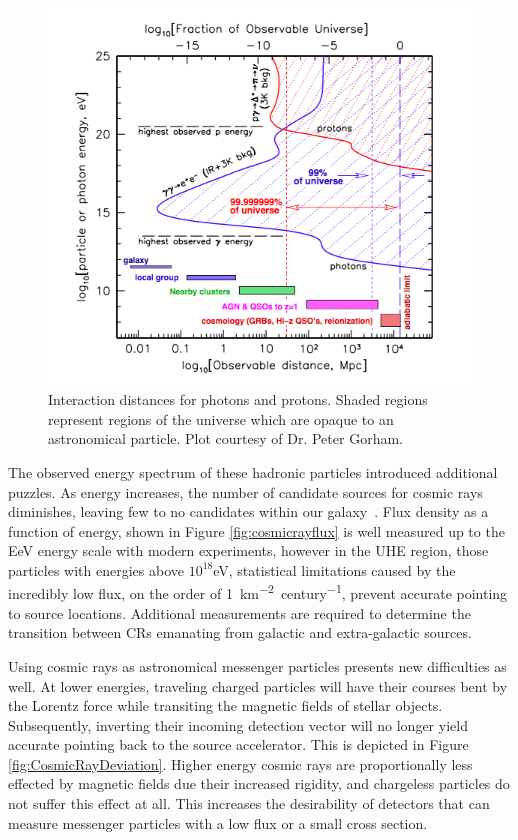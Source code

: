 \begin{figure}
\centering
	\includegraphics[width=\textwidth]{figures/ObservableUniverse}
	\caption{Interaction distances for photons and protons.  Shaded regions represent regions of the universe which are opaque to an astronomical particle. Plot courtesy of Dr. Peter Gorham.}
\label{fig:observableUniverse}
\end{figure}
	
	The observed energy spectrum of these hadronic particles introduced additional puzzles. As energy increases, the number of candidate sources for cosmic rays diminishes, leaving few to no candidates within our galaxy~\cite{RevModPhys.71.S33}.  Flux density as a function of energy, shown in Figure \ref{fig:cosmicrayflux} is well measured up to the EeV energy scale with modern experiments, however in the UHE region, those particles with energies above $10^{18}$eV, statistical limitations caused by the incredibly low flux, on the order of \SI{1}{\km^{-2} century^{-1}}, prevent accurate pointing to source locations.  Additional measurements are required to determine the transition between CRs emanating from galactic and extra-galactic sources.

	Using cosmic rays as astronomical messenger particles presents new difficulties as well.  At lower energies, traveling charged particles will have their courses bent by the Lorentz force while transiting the magnetic fields of stellar objects. Subsequently, inverting their incoming detection vector will no longer yield accurate pointing back to the source accelerator.  This is depicted in Figure \ref{fig:CosmicRayDeviation}.  Higher energy cosmic rays are proportionally less effected by magnetic fields due their increased rigidity, and chargeless particles do not suffer this effect at all.  This increases the desirability of detectors that can measure messenger particles with a low flux or a small cross section.
	
